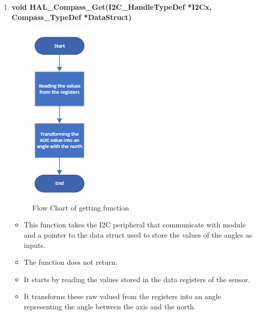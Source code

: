 \begin{enumerate}
    
    \item \textbf{void HAL\_Compass\_Get(I2C\_HandleTypeDef *I2Cx, Compass\_TypeDef *DataStruct)}
    \begin{figure}[h]
        \centering
        \includegraphics[scale=.8]{figures/7.png}
        \caption{Flow Chart of getting function}
    \end{figure}
    \begin{itemize}
        \item This function takes the I2C peripheral that communicate with module and a pointer to the data struct used to store the values of the angles as inputs.
        \item The function does not return.
        \item It starts by reading the values stored in the data registers of the sensor.
        \item It transforms these raw valued from the registers into an angle representing the angle between the axis and the north.
    \end{itemize}
    

\end{enumerate}
